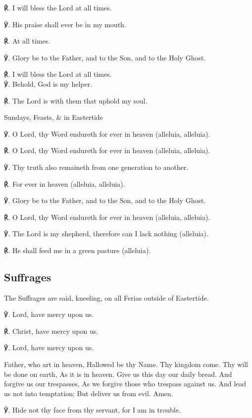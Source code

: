 \begin{multicols}{2}
℟. I will bless the Lord at all times.

℣. His praise shall ever be in my mouth.

℟. At all times.

℣. Glory be to the Father, and to the Son, and to the Holy Ghost.

℟. I will bless the Lord at all times.\\

℣. Behold, God is my helper.

℟. The Lord is with them that uphold my soul.

\begin{inhead}
	Sundays, Feasts, \& in Eastertide
\end{inhead}

℣. O Lord, thy Word endureth for ever in heaven (alleluia, alleluia).

℟. O Lord, thy Word endureth for ever in heaven (alleluia, alleluia).

℣. Thy truth also remaineth from one generation to another.

℟. For ever in heaven (alleluia, alleluia).

℣. Glory be to the Father, and to the Son, and to the Holy Ghost.

℟. O Lord, thy Word endureth for ever in heaven (alleluia, alleluia).

℣. The Lord is my shepherd, therefore can I lack nothing (alleluia).

℟. He shall feed me in a green pasture (alleluia).

\subsection{Suffrages}
\begin{rubric}
	The Suffrages are said, kneeling, on all Ferias outside of Eastertide.
\end{rubric}

℣. Lord, have mercy upon us.

℟. Christ, have mercy upon us.

℣. Lord, have mercy upon us.

 Father, who art in heaven, Hallowed be thy Name. Thy kingdom come. Thy will be done on earth, As it is in heaven. Give us this day our daily bread. And forgive us our trespasses, As we forgive those who trespass against us. And lead us not into temptation; But deliver us from evil. Amen.

℣. Hide not thy face from thy servant, for I am in trouble.


\end{multicols}
